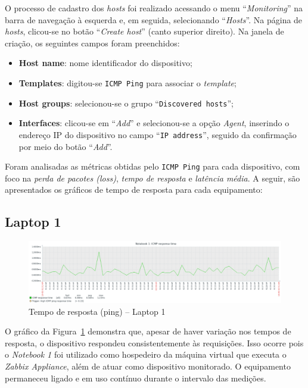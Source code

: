 \documentclass[12pt]{article}
\begin{document}
O processo de cadastro dos \textit{hosts} foi realizado acessando o menu ``\textit{Monitoring}'' na barra de navegação à esquerda e, em seguida, selecionando ``\textit{Hosts}''. Na página de \textit{hosts}, clicou-se no botão ``\textit{Create host}'' (canto superior direito). Na janela de criação, os seguintes campos foram preenchidos:

\begin{itemize}
  \item \textbf{Host name}: nome identificador do dispositivo;
  \item \textbf{Templates}: digitou-se \texttt{ICMP Ping} para associar o \textit{template};
  \item \textbf{Host groups}: selecionou-se o grupo ``\texttt{Discovered hosts}'';
  \item \textbf{Interfaces}: clicou-se em ``\textit{Add}'' e selecionou-se a opção \textit{Agent}, inserindo o endereço IP do dispositivo no campo ``\texttt{IP address}'', seguido da confirmação por meio do botão ``\textit{Add}''.
\end{itemize}

Foram analisadas as métricas obtidas pelo \texttt{ICMP Ping} para cada dispositivo, com foco na \textit{perda de pacotes (loss)}, \textit{tempo de resposta} e \textit{latência média}. A seguir, são apresentados os gráficos de tempo de resposta para cada equipamento:

\subsection{Laptop 1}

\begin{figure}[h!]
  \centering
  \includegraphics[width=0.9\linewidth]{Laptop_1.png}
  \caption{Tempo de resposta (ping) – Laptop 1}
  \label{fig:laptop_1_ping}
\end{figure}

O gráfico da Figura~\ref{fig:laptop_1_ping} demonstra que, apesar de haver variação nos tempos de resposta, o dispositivo respondeu consistentemente às requisições. Isso ocorre pois o \textit{Notebook 1} foi utilizado como hospedeiro da máquina virtual que executa o \textit{Zabbix Appliance}, além de atuar como dispositivo monitorado. O equipamento permaneceu ligado e em uso contínuo durante o intervalo das medições.
\end{document}
